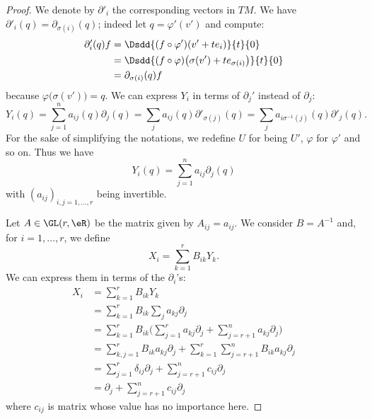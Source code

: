 \begin{proof}
    We denote by \( \partial'_i\) the corresponding vectors in \( TM\). We have \( \partial'_i(q)=\partial_{\sigma(i)}(q)\); indeed let \( q=\varphi'(v')\) and compute:
    \begin{subequations}
        \begin{align}
            \partial'_i(q)f&=\Dsdd{ (f\circ\varphi')(v'+te_i) }{t}{0}\\
            &=\Dsdd{ (f\circ\varphi)\big( \sigma(v')+te_{\sigma(i)} \big) }{t}{0}\\
            &=\partial_{\sigma(i)}(q)f
        \end{align}
    \end{subequations}
    because \( \varphi\big( \sigma(v') \big)=q\). We can express \( Y_i\) in terms of \( \partial_j'\) instead of \( \partial_j\):
    \begin{equation}
        Y_i(q)=\sum_{j=1}^na_{ij}(q)\partial_j(q)=\sum_ja_{ij}(q)\partial'_{\sigma(j)}(q)=\sum_ja_{i\sigma^{-1}(j)}(q)\partial'_j(q).
    \end{equation}
    For the sake of simplifying the notations, we redefine \( U\) for being \( U'\), \( \varphi\) for \( \varphi'\) and so on. Thus we have
    \begin{equation}
        Y_i(q)=\sum_{j=1}^na_{ij}\partial_j(q)
    \end{equation}
    with \( (a_{ij})_{i,j=1,\ldots, r} \) being invertible.

    Let \( A\in \GL(r,\eR)\) be the matrix given by \( A_{ij}=a_{ij}\). We consider \( B=A^{-1}\) and, for \( i=1,\ldots, r\), we define
    \begin{equation}
        X_i=\sum_{k=1}^rB_{ik}Y_k.
    \end{equation}
    We can express them in terms of the \( \partial_i\)'s:
    \begin{subequations}
        \begin{align}
            X_i&=\sum_{k=1}^rB_{ik}Y_k\\
            &=\sum_{k=1}^rB_{ik}\sum_ja_{kj}\partial_j\\
            &=\sum_{k=1}^rB_{ik}\big( \sum_{j=1}^ra_{kj}\partial_j+\sum_{j=r+1}^na_{kj}\partial_j \big)\\
            &=\sum_{k,j=1}^rB_{ik}a_{kj}\partial_j+\sum_{k=1}^r\sum_{j=r+1}^nB_{ik}a_{kj}\partial_j\\
            &=\sum_{j=1}^r\delta_{ij}\partial_j+\sum_{j=r+1}^nc_{ij}\partial_j\\
            &=\partial_j+\sum_{j=r+1}^nc_{ij}\partial_j
        \end{align}
    \end{subequations}
    where \( c_{ij}\) is matrix whose value has no importance here.   


\end{proof}

